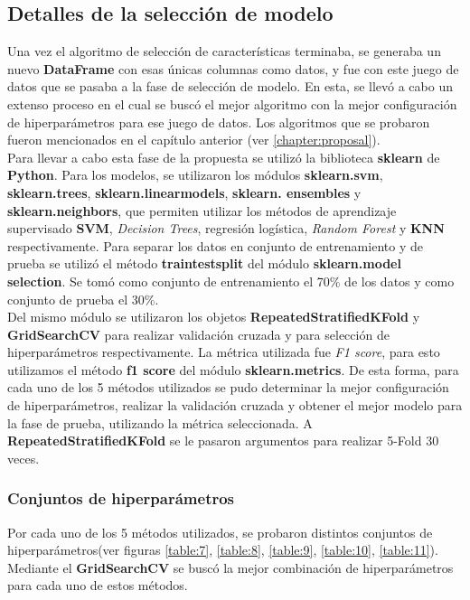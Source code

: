 	\subsection{Detalles de la selección de modelo}
		Una vez el algoritmo de selección de características terminaba, se generaba un nuevo \textbf{DataFrame} con esas únicas columnas como datos,
		y fue con este juego de datos que se pasaba a la fase de selección de modelo. En esta, se llevó a cabo un extenso proceso en el cual se buscó
		el mejor algoritmo con la mejor configuración de hiperparámetros para ese juego de datos. Los algoritmos que se probaron fueron
		mencionados en el capítulo anterior (ver \ref {chapter:proposal}).\\
		\indent Para llevar a cabo esta fase de la propuesta se utilizó la biblioteca \textbf{sklearn} de \textbf{Python}.
		Para los modelos, se utilizaron los módulos \textbf{sklearn.svm}, \textbf{sklearn.trees}, \textbf{sklearn.linear\textunderscore models},
		\textbf{sklearn. ensembles} y \textbf{sklearn.neighbors}, que permiten utilizar los métodos de aprendizaje supervisado \textbf{SVM}, \emph
		{Decision Trees}, regresión logística, \emph{Random Forest} y \textbf{KNN} respectivamente. Para separar los datos en conjunto de entrenamiento
		y de prueba se utilizó el método \textbf{train\textunderscore test\textunderscore split} del módulo \textbf{sklearn.model\textunderscore
		selection}. Se tomó como  conjunto de entrenamiento el 70\% de los datos y como conjunto de prueba el 30\%.\\
		\indent Del mismo módulo se utilizaron los objetos \textbf {RepeatedStratifiedKFold} y \textbf{GridSearchCV} para realizar validación cruzada y
		para selección de hiperparámetros respectivamente. La métrica utilizada fue \emph{F1 score}, para esto utilizamos el método \textbf{f1\textunderscore
		score} del módulo \textbf{sklearn.metrics}. De esta forma, para cada uno de los 5 métodos utilizados se pudo determinar la mejor configuración
		de hiperparámetros, realizar la validación cruzada y obtener el mejor modelo para la fase de prueba, utilizando la métrica seleccionada. A \textbf{
		RepeatedStratifiedKFold} se le pasaron argumentos para realizar 5-Fold 30 veces.

		\subsubsection{Conjuntos de hiperparámetros}
			Por cada uno de los 5 métodos utilizados, se probaron distintos conjuntos de hiperparámetros(ver figuras \ref{table:7}, \ref{table:8},
			\ref{table:9}, \ref{table:10}, \ref{table:11}). Mediante el \textbf{GridSearchCV} se buscó la mejor combinación de hiperparámetros 
			para cada uno de estos métodos.

